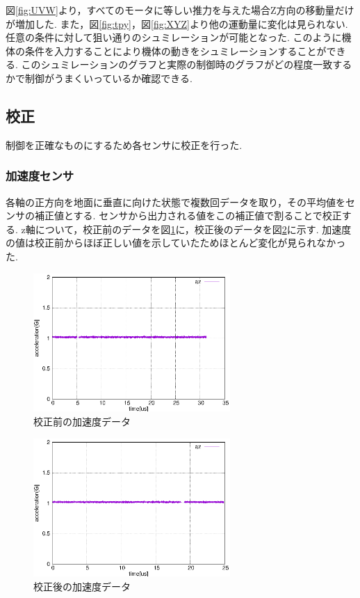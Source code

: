 \documentclass[12pt,oneside]{sotsuken_paper}
\begin{document}
図\ref{fig:UVW}より，すべてのモータに等しい推力を与えた場合Z方向の移動量だけが増加した.
また，図\ref{fig:tpy}，図\ref{fig:XYZ}より他の運動量に変化は見られない.
任意の条件に対して狙い通りのシュミレーションが可能となった.
このように機体の条件を入力することにより機体の動きをシュミレーションすることができる.
このシュミレーションのグラフと実際の制御時のグラフがどの程度一致するかで制御がうまくいっているか確認できる.

\subsection{校正}
制御を正確なものにするため各センサに校正を行った.

\subsubsection{加速度センサ}
各軸の正方向を地面に垂直に向けた状態で複数回データを取り，その平均値をセンサの補正値とする.
センサから出力される値をこの補正値で割ることで校正する.
z軸について，校正前のデータを図\ref{fig:acc-calib-be}に，校正後のデータを図\ref{fig:acc-calib-af}に示す.
加速度の値は校正前からほぼ正しい値を示していたためほとんど変化が見られなかった.

\begin{figure}[htbp]
	\begin{center}
		\includegraphics[width=75mm]{image/calibration/acc-calib-be.eps}
		\caption{校正前の加速度データ}
		\label{fig:acc-calib-be}
	\end{center}
\end{figure}

\begin{figure}[htbp]
	\begin{center}
		\includegraphics[width=75mm]{image/calibration/acc-calib-af.eps}
		\caption{校正後の加速度データ}
		\label{fig:acc-calib-af}
	\end{center}
\end{figure}
\end{document}
